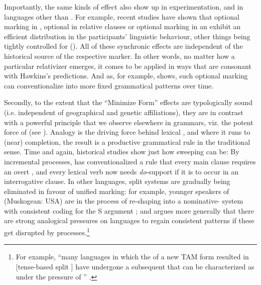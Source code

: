 \documentclass[output=paper]{langsci/langscibook}
\begin{document}
Importantly, the same kinds of effect also show up in  experimentation, and in languages other than . For example, recent studies have shown that optional  marking in , optional  in  relative clauses or optional  marking in an  exhibit an efficient distribution in the participants’ linguistic behaviour, other things being tightly controlled for (\citealt{KurumadaJaeger2015,NorcliffeJaeger2016,KurumadaGrimm2017}). All of these synchronic effects are independent of the historical source of the respective marker. In other words, no matter how a particular relativizer emerges, it comes to be applied in ways that are consonant with Hawkins’s  predictions. And as, for example,  shows, such optional marking can conventionalize into more fixed grammatical patterns over time.
\newpage

Secondly, to the extent that the “Minimize Form” effects are typologically sound (i.e. independent of geographical and genetic affiliations), they are in contrast with a powerful principle that we observe elsewhere in grammars, viz. the potent force of  (see \citealt{GentnerSmith2012,BlevinsBlevins2009}). Analogy is the driving force behind lexical , and where it runs to (near) completion, the result is a productive grammatical rule in the traditional sense. Time and again, historical studies show just how sweeping  can be: By incremental  processes,  has conventionalized a rule that every main clause requires an overt , and every lexical verb now needs \textit{do}{}-support if it is to occur in an interrogative clause. In other languages, split  systems are gradually being eliminated in favour of unified marking: for example, younger speakers of  (Muskogean: USA) are in the process of re-shaping  into a nominative- system with consistent coding for the S argument \citep[140]{Broadwell2006_Choct}; and \citet{Creissels2018_OblCod} argues more generally that there are strong analogical pressures on languages to regain consistent  patterns if these get disrupted by  processes.\footnote{For example, “many languages in which the  of a new TAM form resulted in [tense-based split  ] have undergone a subsequent  that can be characterized as  under the pressure of ” \citep[81]{Creissels2018_OblCod}.} 
\end{document}
